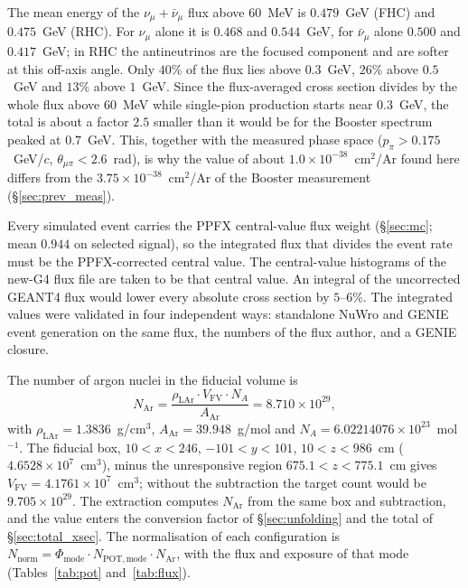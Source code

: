 \documentclass[11pt,a4paper]{article}
\begin{document}
The mean energy of the $\nu_\mu+\bar\nu_\mu$ flux above $60$~MeV is $0.479$~GeV (FHC) and
$0.475$~GeV (RHC). For $\nu_\mu$ alone it is $0.468$ and $0.544$~GeV, for $\bar{\nu}_\mu$ alone
$0.500$ and $0.417$~GeV; in RHC the antineutrinos are the focused component and are softer at this
off-axis angle. Only $40\%$ of the flux lies above $0.3$~GeV, $26\%$ above $0.5$~GeV and $13\%$
above $1$~GeV. Since the flux-averaged cross section divides by the whole flux above $60$~MeV while
single-pion production starts near $0.3$~GeV, the total is about a factor $2.5$ smaller than it
would be for the Booster spectrum peaked at $0.7$~GeV. This, together with the measured phase
space ($p_\pi>0.175$~GeV/$c$, $\theta_{\mu\pi}<2.6$~rad), is why the value of about
$1.0\times10^{-38}$~cm$^2$/Ar found here differs from the $3.75\times10^{-38}$~cm$^2$/Ar of the
Booster measurement (\S\ref{sec:prev_meas}).

Every simulated event carries the PPFX central-value flux weight (\S\ref{sec:mc}; mean $0.944$ on
selected signal), so the integrated flux that divides the event rate must be the PPFX-corrected
central value. The central-value histograms of the new-G4 flux file are taken to be that central
value. An integral of the uncorrected GEANT4 flux would lower every absolute cross section by
$5$--$6\%$. The integrated values were validated in four independent ways: standalone NuWro and
GENIE event generation on the same flux, the numbers of the flux author, and a GENIE closure.

The number of argon nuclei in the fiducial volume is
\begin{equation}
  N_{\mathrm{Ar}} = \frac{\rho_{\mathrm{LAr}} \cdot V_{\mathrm{FV}} \cdot N_A}{A_{\mathrm{Ar}}}
  = 8.710\times10^{29},
  \label{eq:nar}
\end{equation}
with $\rho_{\mathrm{LAr}}=1.3836$~g/cm$^3$, $A_{\mathrm{Ar}}=39.948$~g/mol and
$N_A=6.02214076\times10^{23}$~mol$^{-1}$. The fiducial box, $10<x<246$, $-101<y<101$,
$10<z<986$~cm ($4.6528\times10^{7}$~cm$^3$), minus the unresponsive region $675.1<z<775.1$~cm gives
$V_{\mathrm{FV}}=4.1761\times10^{7}$~cm$^3$; without the subtraction the target count would be
$9.705\times10^{29}$. The extraction computes $N_{\mathrm{Ar}}$ from the same box and subtraction,
and the value enters the conversion factor of \S\ref{sec:unfolding} and the total of
\S\ref{sec:total_xsec}. The normalisation of each configuration is $N_{\mathrm{norm}} =
\Phi_\mathrm{mode}\cdot N_{\mathrm{POT,mode}}\cdot N_{\mathrm{Ar}}$, with the flux and exposure of
that mode (Tables~\ref{tab:pot} and~\ref{tab:flux}).
\end{document}
